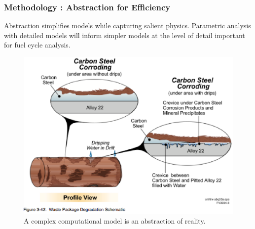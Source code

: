 \begin{frame}[ctb!]
  \frametitle{Methodology : Abstraction for Efficiency}

  \begin{minipage}{0.49\textwidth}
      Abstraction simplifies models while capturing salient physics. 
      Parametric analysis with detailed models will inform simpler models at the 
      level of detail important for fuel cycle analysis.
    \begin{figure}[h!]
        \includegraphics[width=\textwidth]{reality.eps}
      \caption{A complex computational model is an abstraction of reality.}
      \label{fig:reality}
    \end{figure}
  \end{minipage}
  \hspace{0.01cm}
  \begin{minipage}{0.49\textwidth}
    \begin{figure}[h!]

\end{figure}
\end{minipage}
\end{frame}
